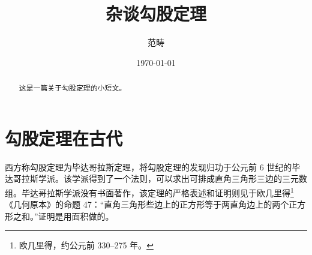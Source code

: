 \documentclass[UTF8]{ctexart}
\title{\heiti 杂谈勾股定理}
\author{\kaishu 范畴}
\date{\today}
\begin{document}
\maketitle
\begin{abstract}
这是一篇关于勾股定理的小短文。
\end{abstract}

\tableofcontents
\section{勾股定理在古代}
\label{section:1}
西方称勾股定理为毕达哥拉斯定理，将勾股定理的发现归功于公元前 6 世纪的毕达哥拉斯学派\cite{Kline}。该学派得到了一个法则，可以求出可排成直角三角形三边的三元数组。毕达哥拉斯学派没有书面著作，该定理的严格表述和证明则见于欧几里得\footnote{欧几里得，约公元前 330--275 年。}《几何原本》的命题 47：“直角三角形些边上的正方形等于两直角边上的两个正方形之和。”证明是用面积做的。
\end{document}

